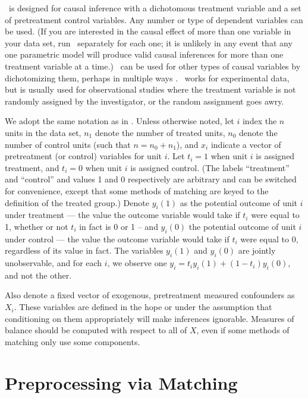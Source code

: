 
\MatchIt\ is designed for causal inference with a dichotomous treatment
variable and a set of pretreatment control variables.  Any number or
type of dependent variables can be used.  (If you are interested in
the causal effect of more than one variable in your data set, run
\MatchIt\ separately for each one; it is unlikely in any event that
any one parametric model will produce valid causal inferences for more
than one treatment variable at a time.)  \MatchIt\ can be used for
other types of causal variables by dichotomizing them, perhaps in
multiple ways \citep[see also][]{ImaDyk04}.  \MatchIt\ works for
experimental data, but is usually used for observational studies where
the treatment variable is not randomly assigned by the investigator,
or the random assignment goes awry.

We adopt the same notation as in \citet*{HoImaKin07}.  Unless
otherwise noted, let $i$ index the $n$ units in the data set, $n_1$
denote the number of treated units, $n_0$ denote the number of control
units (such that $n=n_0+n_1$), and $x_i$ indicate a vector of
pretreatment (or control) variables for unit $i$.  Let $t_i=1$ when
unit $i$ is assigned treatment, and $t_i=0$ when unit $i$ is assigned
control.  (The labels ``treatment'' and ``control'' and values 1 and 0
respectively are arbitrary and can be switched for convenience, except
that some methods of matching are keyed to the definition of the
treated group.)  Denote $y_i(1)$ as the potential outcome of unit $i$
under treatment --- the value the outcome variable would take if $t_i$
were equal to 1, whether or not $t_i$ in fact is 0 or 1 -- and
$y_i(0)$ the potential outcome of unit $i$ under control --- the value
the outcome variable would take if $t_i$ were equal to 0, regardless
of its value in fact.  The variables $y_i(1)$ and $y_i(0)$ are jointly
unobservable, and for each $i$, we observe one
$y_i=t_iy_i(1)+(1-t_i)y_i(0)$, and not the other.  

Also denote a fixed vector of exogenous, pretreatment measured
confounders as $X_i$.  These variables are defined in the hope or
under the assumption that conditioning on them appropriately will make
inferences ignorable.  Measures of balance should be computed with
respect to all of $X$, even if some methods of matching only use some
components.

\section{Preprocessing via Matching}

